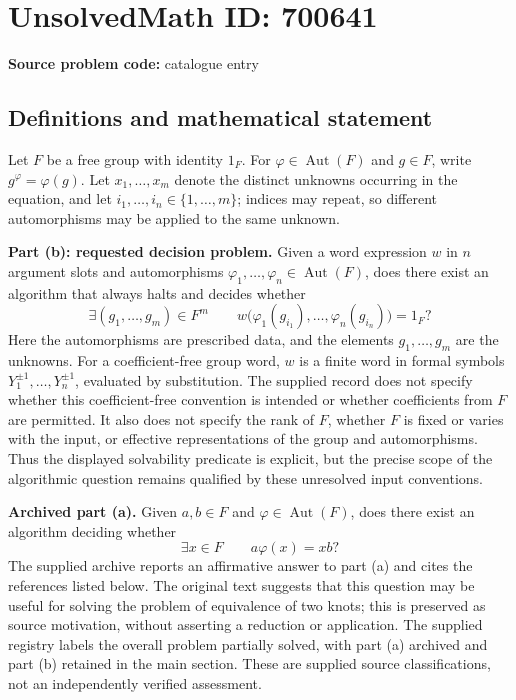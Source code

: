 \documentclass[11pt]{article}
\begin{document}
\section*{UnsolvedMath ID: 700641}
\textbf{Source problem code:} catalogue entry
\subsection{Definitions and mathematical statement}
Let \(F\) be a free group with identity \(1_F\). For \(\varphi\in\operatorname{Aut}(F)\) and \(g\in F\), write \(g^\varphi=\varphi(g)\). Let \(x_1,\ldots,x_m\) denote the distinct unknowns occurring in the equation, and let \(i_1,\ldots,i_n\in\{1,\ldots,m\}\); indices may repeat, so different automorphisms may be applied to the same unknown.

\textbf{Part (b): requested decision problem.} Given a word expression \(w\) in \(n\) argument slots and automorphisms \(\varphi_1,\ldots,\varphi_n\in\operatorname{Aut}(F)\), does there exist an algorithm that always halts and decides whether
\[
\exists(g_1,\ldots,g_m)\in F^m\qquad
w\bigl(\varphi_1(g_{i_1}),\ldots,\varphi_n(g_{i_n})\bigr)=1_F?
\]
Here the automorphisms are prescribed data, and the elements \(g_1,\ldots,g_m\) are the unknowns. For a coefficient-free group word, \(w\) is a finite word in formal symbols \(Y_1^{\pm1},\ldots,Y_n^{\pm1}\), evaluated by substitution. The supplied record does not specify whether this coefficient-free convention is intended or whether coefficients from \(F\) are permitted. It also does not specify the rank of \(F\), whether \(F\) is fixed or varies with the input, or effective representations of the group and automorphisms. Thus the displayed solvability predicate is explicit, but the precise scope of the algorithmic question remains qualified by these unresolved input conventions.

\textbf{Archived part (a).} Given \(a,b\in F\) and \(\varphi\in\operatorname{Aut}(F)\), does there exist an algorithm deciding whether
\[
\exists x\in F\qquad a\varphi(x)=xb?
\]
The supplied archive reports an affirmative answer to part (a) and cites the references listed below. The original text suggests that this question may be useful for solving the problem of equivalence of two knots; this is preserved as source motivation, without asserting a reduction or application. The supplied registry labels the overall problem partially solved, with part (a) archived and part (b) retained in the main section. These are supplied source classifications, not an independently verified assessment.
\end{document}
